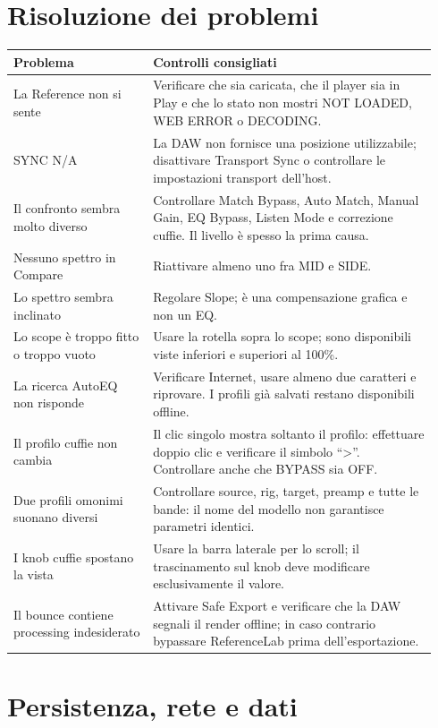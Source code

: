 \documentclass[11pt,a4paper]{article}
\begin{document}
\section{Risoluzione dei problemi}

\begin{longtable}{p{0.31\linewidth}p{0.63\linewidth}}
\toprule
\textbf{Problema} & \textbf{Controlli consigliati}\\
\midrule
\endhead
La Reference non si sente & Verificare che sia caricata, che il player sia in
Play e che lo stato non mostri NOT LOADED, WEB ERROR o DECODING.\\
SYNC N/A & La DAW non fornisce una posizione utilizzabile; disattivare
Transport Sync o controllare le impostazioni transport dell'host.\\
Il confronto sembra molto diverso & Controllare Match Bypass, Auto Match,
Manual Gain, EQ Bypass, Listen Mode e correzione cuffie. Il livello è spesso la
prima causa.\\
Nessuno spettro in Compare & Riattivare almeno uno fra MID e SIDE.\\
Lo spettro sembra inclinato & Regolare Slope; è una compensazione grafica e non
un EQ.\\
Lo scope è troppo fitto o troppo vuoto & Usare la rotella sopra lo scope; sono
disponibili viste inferiori e superiori al 100\%.\\
La ricerca AutoEQ non risponde & Verificare Internet, usare almeno due
caratteri e riprovare. I profili già salvati restano disponibili offline.\\
Il profilo cuffie non cambia & Il clic singolo mostra soltanto il profilo:
effettuare doppio clic e verificare il simbolo ``\textgreater''. Controllare
anche che BYPASS sia OFF.\\
Due profili omonimi suonano diversi & Controllare source, rig, target, preamp e
tutte le bande: il nome del modello non garantisce parametri identici.\\
I knob cuffie spostano la vista & Usare la barra laterale per lo scroll; il
trascinamento sul knob deve modificare esclusivamente il valore.\\
Il bounce contiene processing indesiderato & Attivare Safe Export e verificare
che la DAW segnali il render offline; in caso contrario bypassare ReferenceLab
prima dell'esportazione.\\
\bottomrule
\end{longtable}

\section{Persistenza, rete e dati}
\end{document}

